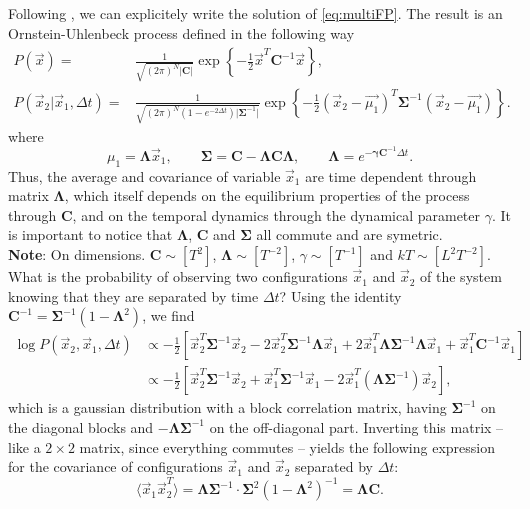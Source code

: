 \documentclass[10pt]{article}
\newcommand{\xo}{\vec{x}_1}
\newcommand{\xt}{\vec{x}_2}
\newcommand{\Lam}{\bm{\Lambda}}
\newcommand{\Sig}{\bm{\Sigma}}
\begin{document}
Following \cite{singh2017multiOU}, we can explicitely write the solution of \ref{eq:multiFP}. The result is an Ornstein-Uhlenbeck process defined in the following way
\begin{equation}
  \label{eq:multiOU}
  \begin{split}
    P(\vec{x}) =& \frac{1}{\sqrt{(2\pi)^N \vert \bm{C}\vert}}\exp\left\{ -\frac{1}{2}\vec{x}^T\bm{C}^{-1}\vec{x} \right\},\\
    P(\vec{x}_2 | \vec{x}_1, \Delta t) =& \frac{1}{\sqrt{(2\pi)^N(1-e^{-2\Delta t})\vert\bm{\Sigma}^{-1}\vert}}\exp\left\{ -\frac{1}{2}(\vec{x}_2 - \vec{\mu_1})^T\bm{\Sigma}^{-1}(\vec{x}_2 - \vec{\mu_1}) \right\}.
  \end{split}
\end{equation}
where 
$$ \mu_1 = \Lam\vec{x}_1, \qquad \bm{\Sigma} = \bm{C} - \Lam\bm{C}\Lam, \qquad \Lam = e^{-\bm{\gamma C}^{-1}\Delta t}.$$ Thus, the average and covariance of variable $\vec{x}_1$ are time dependent through matrix $\Lam$, which itself depends on the equilibrium properties of the process through $\bm{C}$, and on the temporal dynamics through the dynamical parameter $\gamma$. It is important to notice that $\Lam$, $\bm{C}$ and $\bm{\Sigma}$ all commute and are symetric. \\

\textbf{Note}: On dimensions. $\bm{C}\sim [T^2]$, $\Lam\sim[T^{-2}]$, $\gamma\sim[T^{-1}]$ and $kT\sim[L^2T^{-2}]$.\\

What is the probability of observing two configurations $\vec{x}_1$ and $\vec{x}_2$ of the system knowing that they are separated by time $\Delta t$? Using the identity $\bm{C}^{-1} = \Sig^{-1}(1-\Lam^2)$, we find
\begin{equation}
  \label{eq:JointProbTwoVar}
  \begin{split}
    \log P(\vec{x}_2, \vec{x}_1, \Delta t) &\propto -\frac{1}{2}\left[ \xt^T\Sig^{-1}\xt - 2\xt^T\Sig^{-1}\Lam\xo + 2\xo^T\Lam\Sig^{-1}\Lam\xo + \xo^T\bm{C}^{-1}\xo \right]\\
          &\propto -\frac{1}{2}\left[ \xt^T\Sig^{-1}\xt + \xo^T\Sig^{-1}\xo - 2\xo^T(\Lam\Sig^{-1})\xt \right],
  \end{split}
\end{equation}
which is a gaussian distribution with a block correlation matrix, having $\Sig^{-1}$ on the diagonal blocks and $-\Lam\Sig^{-1}$ on the off-diagonal part. Inverting this matrix -- like a $2\times2$ matrix, since everything commutes -- yields the following expression for the covariance of configurations $\xo$ and $\xt$ separated by $\Delta t$:
\begin{equation}
  \langle\xo\xt^T\rangle = \Lam\Sig^{-1}\cdot\Sig^2(1-\Lam^2)^{-1} = \Lam \bm{C}.
\end{equation}
\end{document}
